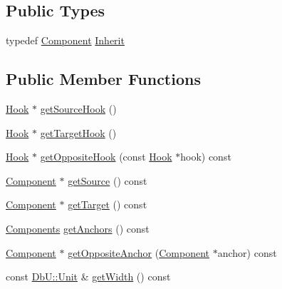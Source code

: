 \subsection*{Public Types}
\begin{DoxyCompactItemize}
\item 
typedef \mbox{\hyperlink{classHurricane_1_1Component}{Component}} \mbox{\hyperlink{classHurricane_1_1Segment_a2f616ba119bb6e9751659814bdbf0320}{Inherit}}
\end{DoxyCompactItemize}
\subsection*{Public Member Functions}
\begin{DoxyCompactItemize}
\item 
\mbox{\hyperlink{classHurricane_1_1Hook}{Hook}} $\ast$ \mbox{\hyperlink{classHurricane_1_1Segment_aa9d0303b444b44d7b8e47d42ac7151eb}{get\+Source\+Hook}} ()
\item 
\mbox{\hyperlink{classHurricane_1_1Hook}{Hook}} $\ast$ \mbox{\hyperlink{classHurricane_1_1Segment_a0fe6cd20516eca2a0b5639ab886bd831}{get\+Target\+Hook}} ()
\item 
\mbox{\hyperlink{classHurricane_1_1Hook}{Hook}} $\ast$ \mbox{\hyperlink{classHurricane_1_1Segment_afcd8471a2f2cfaa0e8e78a84ff7c09fc}{get\+Opposite\+Hook}} (const \mbox{\hyperlink{classHurricane_1_1Hook}{Hook}} $\ast$hook) const
\item 
\mbox{\hyperlink{classHurricane_1_1Component}{Component}} $\ast$ \mbox{\hyperlink{classHurricane_1_1Segment_aaa8954fc5948f2a881cdbc9213f9f7a9}{get\+Source}} () const
\item 
\mbox{\hyperlink{classHurricane_1_1Component}{Component}} $\ast$ \mbox{\hyperlink{classHurricane_1_1Segment_a1f7f13b33be3b1a20ea23b3f501296e9}{get\+Target}} () const
\item 
\mbox{\hyperlink{namespaceHurricane_a7d26d99aeb5dd6d70d51bd35d2473e72}{Components}} \mbox{\hyperlink{classHurricane_1_1Segment_ac179f0263fee7fc71e03c9cf8c2d4e45}{get\+Anchors}} () const
\item 
\mbox{\hyperlink{classHurricane_1_1Component}{Component}} $\ast$ \mbox{\hyperlink{classHurricane_1_1Segment_aa425757f271df5c58b024b0494c21588}{get\+Opposite\+Anchor}} (\mbox{\hyperlink{classHurricane_1_1Component}{Component}} $\ast$anchor) const
\item 
const \mbox{\hyperlink{group__DbUGroup_ga4fbfa3e8c89347af76c9628ea06c4146}{Db\+U\+::\+Unit}} \& \mbox{\hyperlink{classHurricane_1_1Segment_a36c7ddda39077385bd8747a8c1df726a}{get\+Width}} () const

\end{DoxyCompactItemize}
